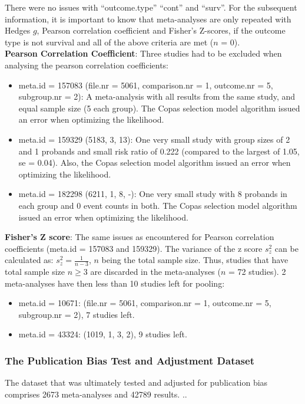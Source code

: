 There were no issues with ``outcome.type'' ``cont'' and ``surv''. For the subsequent information, it is important to know that meta-analyses are only repeated with Hedges $g$, Pearson correlation coefficient and Fisher's Z-scores, if the outcome type is not survival and all of the above criteria are met ($n$ = 0). \\
\textbf{Pearson Correlation Coefficient}: Three studies had to be excluded when analysing the pearson correlation coefficients:
\begin{itemize}
\item meta.id = 157083 (file.nr = 5061, comparison.nr = 1, outcome.nr = 5, subgroup.nr = 2): A meta-analysis with all results from the same study, and equal sample size (5 each group). The Copas selection model algorithm issued an error when optimizing the likelihood.
\item meta.id = 159329 (5183, 3, 13): One very small study with group sizes of 2 and 1 probands and small risk ratio of 0.222 (compared to the largest of 1.05, se = 0.04). Also, the Copas selection model algorithm issued an error when optimizing the likelihood.
\item meta.id = 182298 (6211, 1, 8, -): One very small study with 8 probands in each group and 0 event counts in both. The Copas selection model algorithm issued an error when optimizing the likelihood.
\end{itemize}

\textbf{Fisher's Z score}: The same issues as encountered for Pearson correlation coefficients (meta.id = 157083 and 159329). The variance of the z score $s_z^2$ can be calculated as:  $s_z^2 = \frac{1}{n-3}$, $n$ being the total sample size. Thus, studies that have total sample size $n \geq 3$ are discarded in the meta-analyses ($n$ = 72 studies). 2 meta-analyses have then less than 10 studies left for pooling: 
\begin{itemize}
\item meta.id = 10671: (file.nr = 5061, comparison.nr = 1, outcome.nr = 5, subgroup.nr = 2), 7 studies left.
\item meta.id = 43324: (1019, 1, 3, 2), 9 studies left.
\end{itemize}

\subsubsection{The Publication Bias Test and Adjustment Dataset}
The dataset that was ultimately tested and adjusted for publication bias comprises 2673 meta-analyses and 42789 results. ..


